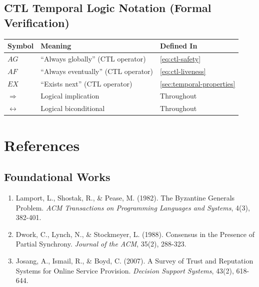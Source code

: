\documentclass[
]{article}
\newcounter{none} %
\begin{document}
\subsection{CTL Temporal Logic Notation (Formal
Verification)}\label{ctl-temporal-logic-notation-formal-verification}

{\def\LTcaptype{none} %
\begin{longtable}[]{@{}lll@{}}
\toprule\noalign{}
Symbol & Meaning & Defined In \\
\midrule\noalign{}
\endhead
\bottomrule\noalign{}
\endlastfoot
\(AG\) & ``Always globally'' (CTL operator) & \cref{eq:ctl-safety} \\
\(AF\) & ``Always eventually'' (CTL operator) &
\cref{eq:ctl-liveness} \\
\(EX\) & ``Exists next'' (CTL operator) &
\cref{sec:temporal-properties} \\
\(\Rightarrow\) & Logical implication & Throughout \\
\(\leftrightarrow\) & Logical biconditional & Throughout \\
\end{longtable}
}

\newpage

\newpage

\section{References}\label{sec:references}

\subsection{Foundational Works}\label{foundational-works}

\begin{enumerate}
\def\labelenumi{\arabic{enumi}.}
\item
  Lamport, L., Shostak, R., \& Pease, M. (1982). The Byzantine Generals
  Problem. \emph{ACM Transactions on Programming Languages and Systems},
  4(3), 382-401.
\item
  Dwork, C., Lynch, N., \& Stockmeyer, L. (1988). Consensus in the
  Presence of Partial Synchrony. \emph{Journal of the ACM}, 35(2),
  288-323.
\item
  Josang, A., Ismail, R., \& Boyd, C. (2007). A Survey of Trust and
  Reputation Systems for Online Service Provision. \emph{Decision
  Support Systems}, 43(2), 618-644.
\end{enumerate}
\end{document}
